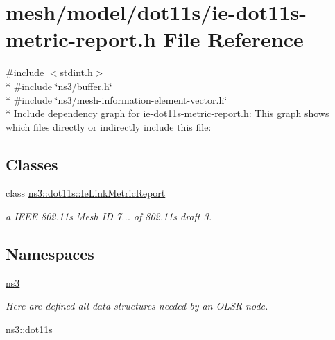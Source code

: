 \hypertarget{ie-dot11s-metric-report_8h}{}\section{mesh/model/dot11s/ie-\/dot11s-\/metric-\/report.h File Reference}
\label{ie-dot11s-metric-report_8h}
{\ttfamily \#include $<$stdint.\+h$>$}\\*
{\ttfamily \#include \char`\"{}ns3/buffer.\+h\char`\"{}}\\*
{\ttfamily \#include \char`\"{}ns3/mesh-\/information-\/element-\/vector.\+h\char`\"{}}\\*
Include dependency graph for ie-\/dot11s-\/metric-\/report.h\+:
This graph shows which files directly or indirectly include this file\+:
\subsection*{Classes}
\begin{DoxyCompactItemize}
\item 
class \hyperlink{classns3_1_1dot11s_1_1IeLinkMetricReport}{ns3\+::dot11s\+::\+Ie\+Link\+Metric\+Report}
\begin{DoxyCompactList}\small\item\em a I\+E\+EE 802.\+11s Mesh ID 7... of 802.\+11s draft 3. \end{DoxyCompactList}\end{DoxyCompactItemize}
\subsection*{Namespaces}
\begin{DoxyCompactItemize}
\item 
 \hyperlink{namespacens3}{ns3}
\begin{DoxyCompactList}\small\item\em Here are defined all data structures needed by an O\+L\+SR node. \end{DoxyCompactList}\item 
 \hyperlink{namespacens3_1_1dot11s}{ns3\+::dot11s}
\end{DoxyCompactItemize}
